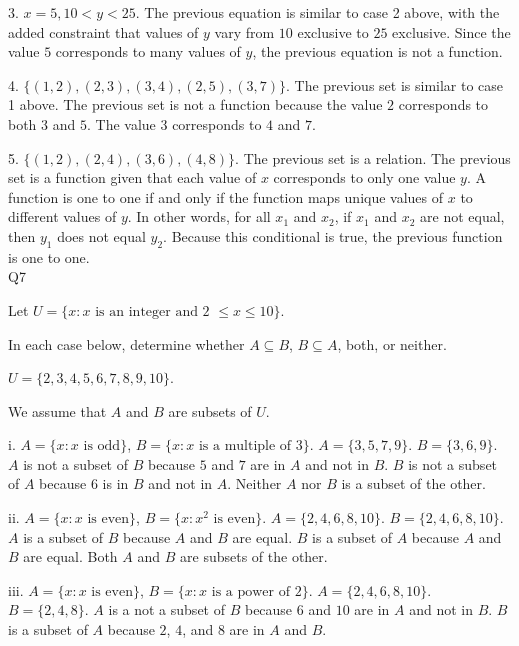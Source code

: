 \documentclass{article}
\begin{document}
3. \(x = 5, 10 < y < 25\). The previous equation is similar to case 2 above, with the added constraint that values of \(y\) vary from \(10\) exclusive to \(25\) exclusive. Since the value \(5\) corresponds to many values of \(y\), the previous equation is not a function.

4. \(\{(1, 2), (2, 3), (3, 4), (2, 5), (3, 7)\}\). The previous set is similar to case 1 above. The previous set is not a function because the value \(2\) corresponds to both \(3\) and \(5\). The value \(3\) corresponds to \(4\) and \(7\).

5. \(\{(1, 2), (2, 4), (3, 6), (4, 8)\}\). The previous set is a relation. The previous set is a function given that each value of \(x\) corresponds to only one value \(y\). A function is one to one if and only if the function maps unique values of \(x\) to different values of \(y\). In other words, for all \(x_1\) and \(x_2\), if \(x_1\) and \(x_2\) are not equal, then \(y_1\) does not equal \(y_2\). Because this conditional is true, the previous function is one to one.\\

Q7

Let \(U = \{x: x \text{ is an integer and 2 } \leq x \leq 10\}\).

In each case below, determine whether \(A \subseteq B\), \(B \subseteq A\), both, or neither.

\(U = \{2, 3, 4, 5, 6, 7, 8, 9, 10\}\).

We assume that \(A\) and \(B\) are subsets of \(U\).

i. \(A = \{x: x \text{ is odd}\}\), \(B = \{x: x \text{ is a multiple of 3}\}\). \(A = \{3, 5, 7, 9\}\). \(B = \{3, 6, 9\}\). \(A\) is not a subset of \(B\) because \(5\) and \(7\) are in \(A\) and not in \(B\). \(B\) is not a subset of \(A\) because \(6\) is in \(B\) and not in \(A\). Neither \(A\) nor \(B\) is a subset of the other.

ii. \(A = \{x: x \text{ is even}\}\), \(B = \{x: x^2 \text{ is even}\}\). \(A = \{2, 4, 6, 8, 10\}\). \(B = \{2, 4, 6, 8, 10\}\). \(A\) is a subset of \(B\) because \(A\) and \(B\) are equal. \(B\) is a subset of \(A\) because \(A\) and \(B\) are equal. Both \(A\) and \(B\) are subsets of the other.

iii. \(A = \{x: x \text{ is even}\}\), \(B = \{x: x \text{ is a power of 2}\}\). \(A = \{2, 4, 6, 8, 10\}\). \(B = \{2, 4, 8\}\). \(A\) is a not a subset of \(B\) because \(6\) and \(10\) are in \(A\) and not in \(B\). \(B\) is a subset of \(A\) because \(2\), \(4\), and \(8\) are in \(A\) and \(B\).
\end{document}
